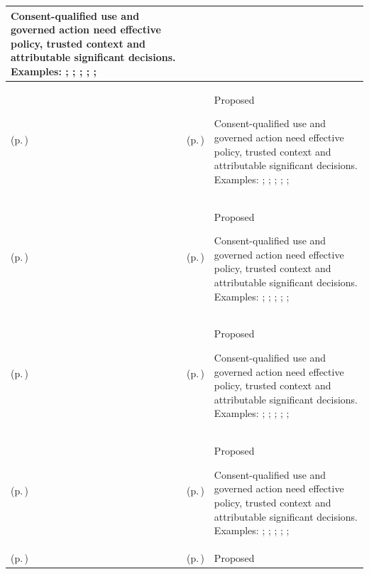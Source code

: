 \begin{longtable}{|>{\raggedright\arraybackslash}p{0.27\TableWidth}|>{\raggedright\arraybackslash}p{0.27\TableWidth}|>{\raggedright\arraybackslash}p{0.46\TableWidth}|}
Consent-qualified use and governed action need effective policy, trusted context and attributable significant decisions. Examples: \nameref{feature:feat-em-09}; \nameref{feature:feat-em-10}; \nameref{function:evaluate-client-consent}; \nameref{service:consent-decision-service}; \nameref{function:evaluate-client-confidentiality-restrictions}; \nameref{service:confidentiality-restriction-evaluation}\\\hline
\nameref{cap:bec-client-privacy} (p.\,\pageref{cap:bec-client-privacy}) & \nameref{cap:ec-02} (p.\,\pageref{cap:ec-02}) & Proposed

Consent-qualified use and governed action need effective policy, trusted context and attributable significant decisions. Examples: \nameref{feature:feat-em-09}; \nameref{feature:feat-em-10}; \nameref{function:evaluate-client-consent}; \nameref{service:consent-decision-service}; \nameref{function:evaluate-client-confidentiality-restrictions}; \nameref{service:confidentiality-restriction-evaluation}\\\hline
\nameref{cap:bec-client-privacy} (p.\,\pageref{cap:bec-client-privacy}) & \nameref{cap:ec-07} (p.\,\pageref{cap:ec-07}) & Proposed

Consent-qualified use and governed action need effective policy, trusted context and attributable significant decisions. Examples: \nameref{feature:feat-em-09}; \nameref{feature:feat-em-10}; \nameref{function:evaluate-client-consent}; \nameref{service:consent-decision-service}; \nameref{function:evaluate-client-confidentiality-restrictions}; \nameref{service:confidentiality-restriction-evaluation}\\\hline
\nameref{cap:bec-health-information-control} (p.\,\pageref{cap:bec-health-information-control}) & \nameref{cap:ec-06} (p.\,\pageref{cap:ec-06}) & Proposed

Consent-qualified use and governed action need effective policy, trusted context and attributable significant decisions. Examples: \nameref{feature:feat-ise-11}; \nameref{feature:feat-ise-12}; \nameref{feature:feat-ise-13}; \nameref{function:evaluate-information-access-authority}; \nameref{service:policy-evaluation-authorisation-service}; \nameref{function:evaluate-consent-constraint}\\\hline
\nameref{cap:bec-health-information-control} (p.\,\pageref{cap:bec-health-information-control}) & \nameref{cap:ec-02} (p.\,\pageref{cap:ec-02}) & Proposed

Consent-qualified use and governed action need effective policy, trusted context and attributable significant decisions. Examples: \nameref{feature:feat-ise-11}; \nameref{feature:feat-ise-12}; \nameref{feature:feat-ise-13}; \nameref{function:evaluate-information-access-authority}; \nameref{service:policy-evaluation-authorisation-service}; \nameref{function:evaluate-consent-constraint}\\\hline
\nameref{cap:bec-health-information-control} (p.\,\pageref{cap:bec-health-information-control}) & \nameref{cap:ec-07} (p.\,\pageref{cap:ec-07}) & Proposed


\end{longtable}
